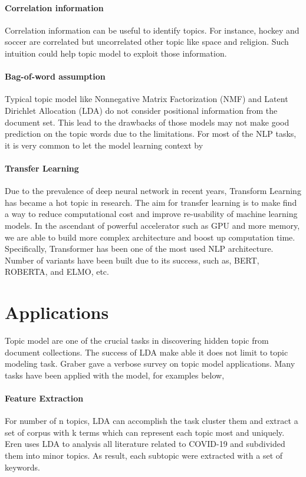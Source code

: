 \paragraph{Correlation information} Correlation information can be useful to identify topics. For instance, hockey and soccer are correlated but uncorrelated other topic like space and religion. Such intuition could help topic model to exploit those information. 
\paragraph{Bag-of-word assumption} Typical topic model like Nonnegative Matrix Factorization (NMF) \cite{lee_learning_1999} and Latent Dirichlet Allocation (LDA) \cite{blei_latent_2003} do not consider positional information from the document set. This lead to the drawbacks of those models may not make good prediction on the topic words due to the limitations. For most of the NLP tasks, it is very common to let the model learning context by
\paragraph{Transfer Learning} Due to the prevalence of deep neural network in recent years, Transform Learning has became a hot topic in research. The aim for transfer learning is to make find a way to reduce computational cost and improve re-usability of machine learning models. In the ascendant of powerful accelerator such as GPU and more memory, we are able to build more complex architecture and boost up computation time. Specifically, Transformer has been one of the most used NLP architecture. Number of variants have been built due to its success, such as, BERT\cite{devlin_bert_2019}, ROBERTA\cite{liu_roberta_2019}, and ELMO\cite{peters_deep_2018}, etc.
\section{Applications}\label{ch1:2}
Topic model are one of the crucial tasks in discovering hidden topic from document collections. The success of LDA make able it does not limit to topic modeling task. Graber\cite{boyd-graber_applications_2017} gave a verbose survey on topic model applications. Many tasks have been applied with the model, for examples below,
\paragraph{Feature Extraction}\label{AAA} For number of n topics, LDA can accomplish the task cluster them and extract a set of corpus with k terms which can represent each topic most and uniquely. Eren \cite{eren_covid-19_2020} uses LDA to analysis all literature related to COVID-19 and subdivided them into minor topics. As result, each subtopic were extracted with a set of keywords.
